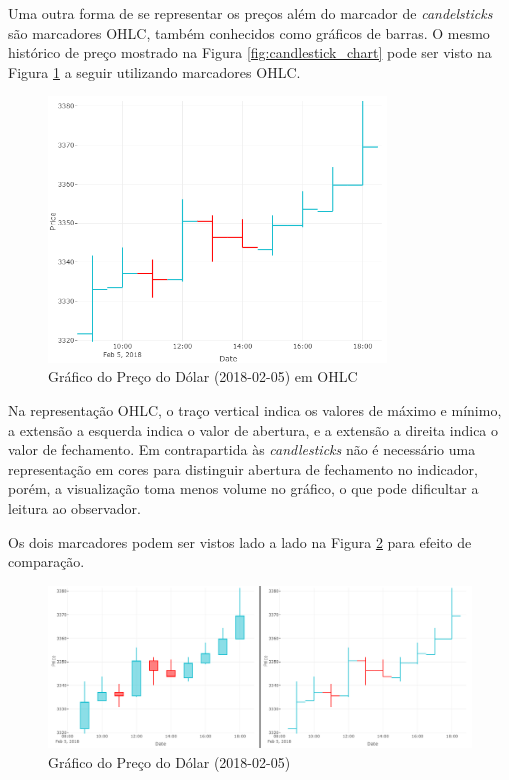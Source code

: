 \documentclass[12pt]{article}
\begin{document}
Uma outra forma de se representar os preços além do marcador de \textit{candelsticks}
são marcadores OHLC, também conhecidos como gráficos de barras.
O mesmo histórico de preço mostrado na Figura \ref{fig:candlestick_chart}
pode ser visto na Figura \ref{fig:ohlc_chart} a seguir utilizando marcadores OHLC.

\begin{figure}[H]
	\centering
	\includegraphics[width=0.8\textwidth]{ohlc_chart.png}
	\caption{Gráfico do Preço do Dólar (2018-02-05) em OHLC}
	\label{fig:ohlc_chart}
\end{figure}

Na representação OHLC, o traço vertical indica os valores de máximo e mínimo, a extensão
a esquerda indica o valor de abertura, e a extensão a direita indica o valor de fechamento.
Em contrapartida às \textit{candlesticks} não é necessário uma representação em cores para
distinguir abertura de fechamento no indicador, porém, a visualização toma menos volume no
gráfico, o que pode dificultar a leitura ao observador.

Os dois marcadores podem ser vistos lado a lado na Figura \ref{fig:chart_comp} para efeito
de comparação.

\begin{figure}[H]
	\centering
	\includegraphics[width=\textwidth]{chart_comp.png}
	\caption{Gráfico do Preço do Dólar (2018-02-05)}
	\label{fig:chart_comp}
\end{figure}
\end{document}
